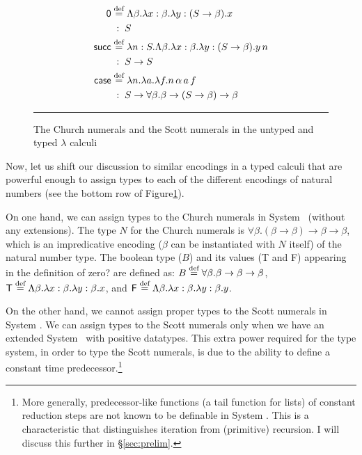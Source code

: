 \begin{figure}
\begin{minipage}{.45\textwidth}
\begin{align*}
\mathsf{0}   &\stackrel{\text{def}}{=} \Lambda\beta.\lambda x:\beta.\lambda y:(S\to\beta). x \\
             &\;:\; S\\
\mathsf{succ}&\stackrel{\text{def}}{=} \lambda n:S.\Lambda\beta.\lambda x:\beta.\lambda y:(S\to\beta). y\,n \\
             &\;:\; S\to S\\
\mathsf{case}&\stackrel{\text{def}}{=} \lambda n.\lambda a.\lambda f. n\,\alpha\,a\,f\\
             &\;:\; S\to \forall \beta.\beta\to(S\to \beta)\to \beta
\end{align*}
\end{minipage}
\caption{The Church numerals and the Scott numerals
         in the untyped and typed $\lambda$ calculi}
\label{fig:ScottNum}
\vspace*{.5em}\hrule
\end{figure}

Now, let us shift our discussion to similar encodings in a typed calculi
that are powerful enough to assign types to each of the different encodings of
natural numbers (see the bottom row of Figure\;\ref{fig:ScottNum}). 

On one hand, we can
assign types to the Church numerals in System \F\ (without any extensions).
The type $N$ for the Church numerals is
$\forall\beta.(\beta\to\beta)\to\beta\to\beta$, which is
an impredicative encoding (\ie $\beta$ can be instantiated with $N$ itself)
of the natural number type. The boolean type ($B$) and
its values (\textsf{T} and \textsf{F}) appearing in the definition of
\textsf{zero?} are defined as: $B\stackrel{\text{def}}{=} \forall\beta.\beta\to\beta\to\beta$,
$\mathsf{T}\stackrel{\text{def}}{=} \Lambda\beta.\lambda x:\beta.\lambda y:\beta.x$, and
$\mathsf{F}\stackrel{\text{def}}{=} \Lambda\beta.\lambda x:\beta.\lambda y:\beta.y$.

On the other hand, we cannot assign proper types to the Scott numerals
in System \F. We can assign types to the Scott numerals only when we have
an extended System \F\ with positive datatypes. This extra power required
for the type system, in order to type the Scott numerals, is due to
the ability to define a constant time predecessor.\footnote{
More generally, predecessor-like functions (\eg a tail function for lists) of
constant reduction steps are not known to be definable in System \F. This is a
characteristic that distinguishes iteration from (primitive) recursion.
I will discuss this further in \S\ref{sec:prelim}.}

